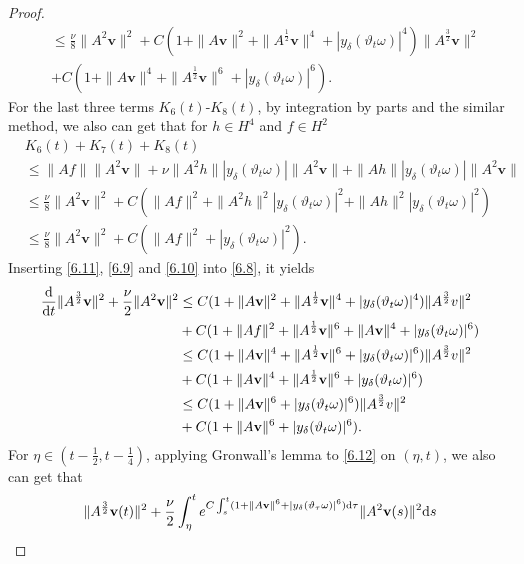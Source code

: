 \documentclass{elsarticle}
\theoremstyle{definition}
\numberwithin{equation}{section}
\renewcommand{\d}{{\rm{d}}}
\begin{document}
\begin{proof}
\begin{align}
&\leq \frac\nu8\|A^{2}\textbf{v}\|^2
+C(1+\|A\textbf{v}\|^2
+\|A^{\frac{1}{2}}\textbf{v}\|^4+|y_\delta(\vartheta_t\omega)|^4)\|A^\frac32\textbf{v}\|^2
\nonumber\\
&+C(1+\|A\textbf{v}\|^4+\|A^{\frac{1}{2}}\textbf{v}\|^6
+|y_\delta(\vartheta_t\omega)|^6).
\end{align}
For the last three terms $K_6(t)$-$K_{8}(t)$, by integration by parts and the similar method, we also can get that for $h\in H^4$ and $f\in H^2$
\begin{align}\label{6.10}
&K_{6}(t)+K_{7}(t)+K_{8}(t)\nonumber\\
&\leq\|Af\|\|A^2\textbf{v}\|+\nu\|A^2h\||y_\delta(\vartheta_t\omega)|\|A^2\textbf{v}\|
+\|Ah\||y_\delta(\vartheta_t\omega)|\|A^2\textbf{v}\|\nonumber\\
&\leq \frac\nu8\|A^2\textbf{v}\|^2+C(\|Af\|^2+\|A^2h\|^2|y_\delta(\vartheta_t\omega)|^2
+\|Ah\|^2|y_\delta(\vartheta_t\omega)|^2)\nonumber\\
&\leq \frac\nu8\|A^2\textbf{v}\|^2+C(\|Af\|^2+|y_\delta(\vartheta_t\omega)|^2
).
\end{align}
Inserting \eqref{6.11}, \eqref{6.9} and \eqref{6.10} into \eqref{6.8}, it yields
\begin{align}\label{6.12}
\frac{\d}{\d t}\|A^\frac{3}{2}\textbf{v}\|^2+\frac{\nu}{2}\|A^2\textbf{v}\|^2&\leq C(1+\|A\textbf{v}\|^2
+\|A^{\frac{1}{2}}\textbf{v}\|^4+|y_\delta(\vartheta_t\omega)|^4)\|A^\frac{3}{2}v\|^2\nonumber\\
&+C(1+\|Af\|^2+\|A^{\frac{1}{2}}\textbf{v}\|^6+\|A\textbf{v}\|^4
+|y_\delta(\vartheta_t\omega)|^6)\nonumber\\
&\leq C(1+\|A\textbf{v}\|^4
+\|A^{\frac{1}{2}}\textbf{v}\|^6+|y_\delta(\vartheta_t\omega)|^6)\|A^\frac{3}{2}v\|^2\nonumber\\
&+C(1+\|A\textbf{v}\|^4+\|A^{\frac{1}{2}}\textbf{v}\|^6
+|y_\delta(\vartheta_t\omega)|^6)\nonumber\\
&\leq C(1+\|A\textbf{v}\|^6
+|y_\delta(\vartheta_t\omega)|^6)\|A^\frac{3}{2}v\|^2\nonumber\\
&+C(1+\|A\textbf{v}\|^6
+|y_\delta(\vartheta_t\omega)|^6).
\end{align}
For  $\eta\in(t-\frac{1}{2},t-\frac{1}{4})$,  applying Gronwall's lemma to \eqref{6.12} on $(\eta,t)$, we also can get that
\begin{align*}
&\|A^\frac{3}{2}\textbf{v}(t)\|^2+\frac\nu2\int_\eta^te^{C\int_s^t(1+\|A\textbf{v}\|^6+|y_\delta(\vartheta_\tau\omega)|^6)\d\tau}
\|A^2\textbf{v}(s)\|^2 \d s\nonumber\\

\end{align*}
\end{proof}
\end{document}
